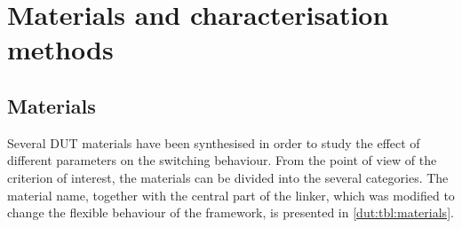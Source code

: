 
\section{Materials and characterisation methods}

\subsection{Materials}

Several DUT materials have been synthesised in order to 
study the effect of different parameters on the switching 
behaviour. From the point of view of the criterion of interest,
the materials can be divided into the several categories.
The material name, together with the central part of the linker, 
which was modified to change the flexible behaviour of the framework,
is presented in \autoref{dut:tbl:materials}.


